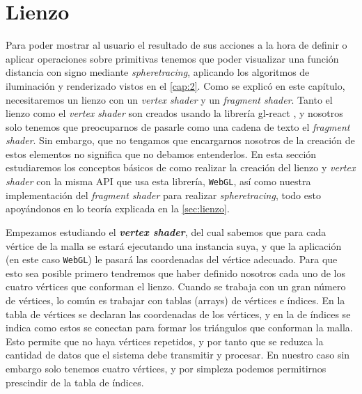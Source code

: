 \section{Lienzo}
Para poder mostrar al usuario el resultado de sus acciones a la hora de definir o aplicar operaciones sobre primitivas tenemos que poder visualizar una función distancia con signo mediante \textit{spheretracing}, aplicando los algoritmos de iluminación y renderizado vistos en el \autoref{cap:2}. Como se explicó en este capítulo, necesitaremos un lienzo con un \textit{vertex shader} y un \textit{fragment shader}. Tanto el lienzo como el \textit{vertex shader} son creados usando la librería gl-react \cite{gl-react}, y nosotros solo tenemos que preocuparnos de pasarle como una cadena de texto el \textit{fragment shader}. Sin embargo, que no tengamos que encargarnos nosotros de la creación de estos elementos no significa que no debamos entenderlos. En esta sección estudiaremos los conceptos básicos de como realizar la creación del lienzo y \textit{vertex shader} \cite{webgl} con la misma API que usa esta  librería, \texttt{WebGL}, así como nuestra implementación del \textit{fragment shader} para realizar \textit{spheretracing}, todo esto apoyándonos en lo teoría explicada en la \autoref{sec:lienzo}.\newline

Empezamos estudiando el \textbf{\textit{vertex shader}}, del cual sabemos que para cada vértice de la malla se estará ejecutando una instancia suya, y que la aplicación (en este caso \texttt{WebGL}) le pasará las coordenadas del vértice adecuado. Para que esto sea posible primero tendremos que haber definido nosotros cada uno de los cuatro vértices que conforman el lienzo. Cuando se trabaja con un gran número de vértices, lo común es trabajar con tablas (arrays) de vértices e índices. En la tabla de vértices se declaran las coordenadas de los vértices, y en la de índices se indica como estos se conectan para formar los triángulos que conforman la malla. Esto permite que no haya vértices repetidos, y por tanto que se reduzca la cantidad de datos que el sistema debe transmitir y procesar. En nuestro caso sin embargo solo tenemos cuatro vértices, y por simpleza podemos permitirnos prescindir de la tabla de índices.\newline

